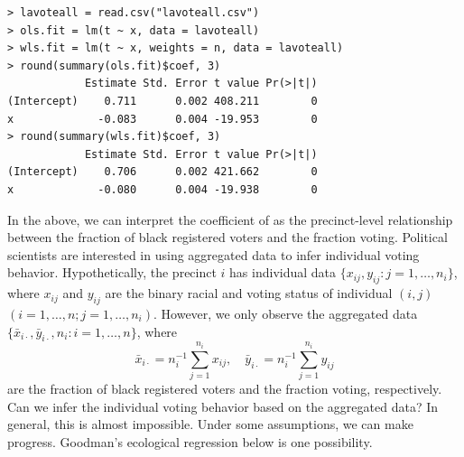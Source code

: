 \begin{lstlisting}
> lavoteall = read.csv("lavoteall.csv")
> ols.fit = lm(t ~ x, data = lavoteall)
> wls.fit = lm(t ~ x, weights = n, data = lavoteall)
> round(summary(ols.fit)$coef, 3)
            Estimate Std. Error t value Pr(>|t|)
(Intercept)    0.711      0.002 408.211        0
x             -0.083      0.004 -19.953        0
> round(summary(wls.fit)$coef, 3)
            Estimate Std. Error t value Pr(>|t|)
(Intercept)    0.706      0.002 421.662        0
x             -0.080      0.004 -19.938        0
\end{lstlisting}




 
In the above, we can interpret the coefficient of  as the precinct-level relationship between the fraction of black registered voters and the fraction voting. Political scientists are interested in using aggregated data to infer individual voting behavior.
Hypothetically, the precinct $i$ has individual data $\{  x_{ij}, y_{ij}  : j = 1, \ldots, n_i\}$, where $x_{ij}$ and $y_{ij}$ are the binary racial and voting status of individual $(i, j)$ $(i=1,\ldots, n; j = 1, \ldots, n_i)$. However, we only observe the aggregated data $\{ \bar{x}_{i\cdot}, \bar{y}_{i\cdot}, n_i :  i = 1,\ldots, n\}$, where 
$$
\bar{x}_{i\cdot} = n_i^{-1} \sum_{j=1}^{n_i}  x_{ij},\quad
\bar{y}_{i\cdot} = n_i^{-1} \sum_{j=1}^{n_i}  y_{ij}
$$ 
are the fraction of black registered voters and the fraction voting, respectively. Can we infer the individual voting behavior based on the aggregated data? In general, this is almost impossible. Under some assumptions, we can make progress. Goodman's ecological regression below is one possibility.  


